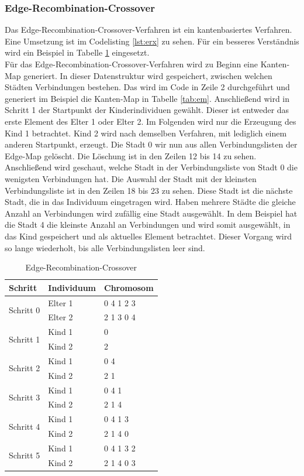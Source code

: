 \subsubsection{Edge-Recombination-Crossover}
Das Edge-Recombination-Crossover-Verfahren \cite[S. 276]{schoeneburg} ist ein kantenbasiertes Verfahren. Eine Umsetzung ist im Codelisting \ref{lst:erx} zu sehen. Für ein besseres Verständnis wird ein Beispiel in Tabelle \ref{tab:erx2} eingesetzt.\\
Für das Edge-Recombination-Crossover-Verfahren wird zu Beginn eine Kanten-Map generiert. In dieser Datenstruktur wird gespeichert, zwischen welchen Städten Verbindungen bestehen. Das wird im Code in Zeile 2 durchgeführt und generiert im Beispiel die Kanten-Map in Tabelle \ref{tab:em}.
Anschließend wird in Schritt 1 der Startpunkt der Kinderindividuen gewählt. Dieser ist entweder das erste Element des Elter 1 oder Elter 2. Im Folgenden wird nur die Erzeugung des Kind 1 betrachtet. Kind 2 wird nach demselben Verfahren, mit lediglich einem anderen Startpunkt, erzeugt.
Die Stadt 0 wir nun aus allen Verbindungslisten der Edge-Map gelöscht. Die Löschung ist in den Zeilen 12 bis 14 zu sehen. Anschließend wird geschaut, welche Stadt in der Verbindungsliste von Stadt 0 die wenigsten Verbindungen hat. Die Auswahl der Stadt mit der kleinsten Verbindungsliste ist in den Zeilen 18 bis 23 zu sehen. Diese Stadt ist die nächste Stadt, die in das Individuum eingetragen wird. Haben mehrere Städte die gleiche Anzahl an Verbindungen wird zufällig eine Stadt ausgewählt. In dem Beispiel hat die Stadt 4 die kleinste Anzahl an Verbindungen und wird somit ausgewählt, in das Kind gespeichert und als aktuelles Element betrachtet. Dieser Vorgang wird so lange wiederholt, bis alle Verbindungslisten leer sind.

\begin{table}[H]
\centering
\caption{Edge-Recombination-Crossover}
\begin{tabularx}{0.5\textwidth}{l|l|l}
Schritt & Individuum & Chromosom\\
\hline
\multirow{2}{*}{Schritt 0}
		& Elter 1 & 0 4 1 2 3\\
		& Elter 2 & 2 1 3 0 4\\
\hline
\multirow{2}{*}{Schritt 1}
		& Kind 1 & 0\\
		& Kind 2 & 2\\
\hline
\multirow{2}{*}{Schritt 2}
		& Kind 1 & 0 4 \\
		& Kind 2 & 2 1 \\
\hline
\multirow{2}{*}{Schritt 3}
		& Kind 1 & 0 4 1\\
		& Kind 2 & 2 1 4\\
\hline
\multirow{2}{*}{Schritt 4}
		& Kind 1 & 0 4 1 3\\
		& Kind 2 & 2 1 4 0\\
\hline
\multirow{2}{*}{Schritt 5}
		& Kind 1 & 0 4 1 3 2\\
		& Kind 2 & 2 1 4 0 3\\
\end{tabularx}
\label{tab:erx2}
\end{table}

